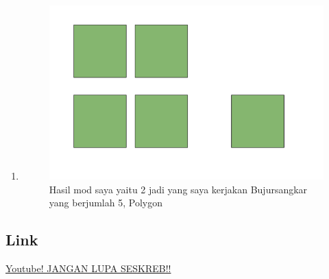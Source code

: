 \begin{enumerate}
	\item 
	
	\begin{figure}[H]
		\includegraphics[width=12cm]{figures/1174050/10.PNG}
		\centering
		\caption{Hasil mod saya yaitu 2 jadi yang saya kerjakan Bujursangkar yang berjumlah 5, Polygon}
	\end{figure}	
\end{enumerate}

\subsection{Link}
\href{https://youtu.be/5X5gnr74VV4}{Youtube! JANGAN LUPA SESKREB!!}